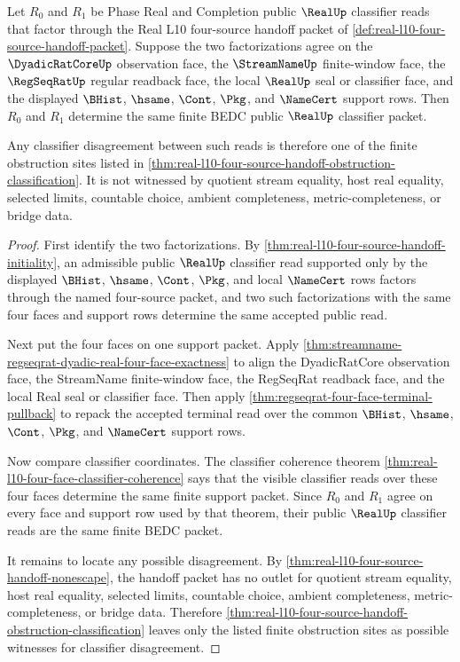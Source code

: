 \begin{theorem}
\label{thm:real-l10-four-source-handoff-classifier-congruence}
Let $R_0$ and $R_1$ be Phase Real and Completion public $\RealUp$ classifier reads that factor through the Real L10 four-source handoff packet of \autoref{def:real-l10-four-source-handoff-packet}. Suppose the two factorizations agree on the $\DyadicRatCoreUp$ observation face, the $\StreamNameUp$ finite-window face, the $\RegSeqRatUp$ regular readback face, the local $\RealUp$ seal or classifier face, and the displayed $\BHist$, $\hsame$, $\Cont$, $\Pkg$, and $\NameCert$ support rows. Then $R_0$ and $R_1$ determine the same finite BEDC public $\RealUp$ classifier packet.

Any classifier disagreement between such reads is therefore one of the finite obstruction sites listed in \autoref{thm:real-l10-four-source-handoff-obstruction-classification}. It is not witnessed by quotient stream equality, host real equality, selected limits, countable choice, ambient completeness, metric-completeness, or bridge data.
\end{theorem}
\begin{proof}
First identify the two factorizations. By \autoref{thm:real-l10-four-source-handoff-initiality}, an admissible public $\RealUp$ classifier read supported only by the displayed $\BHist$, $\hsame$, $\Cont$, $\Pkg$, and local $\NameCert$ rows factors through the named four-source packet, and two such factorizations with the same four faces and support rows determine the same accepted public read.

Next put the four faces on one support packet. Apply \autoref{thm:streamname-regseqrat-dyadic-real-four-face-exactness} to align the DyadicRatCore observation face, the StreamName finite-window face, the RegSeqRat readback face, and the local Real seal or classifier face. Then apply \autoref{thm:regseqrat-four-face-terminal-pullback} to repack the accepted terminal read over the common $\BHist$, $\hsame$, $\Cont$, $\Pkg$, and $\NameCert$ support rows.

Now compare classifier coordinates. The classifier coherence theorem \autoref{thm:real-l10-four-face-classifier-coherence} says that the visible classifier reads over these four faces determine the same finite support packet. Since $R_0$ and $R_1$ agree on every face and support row used by that theorem, their public $\RealUp$ classifier reads are the same finite BEDC packet.

It remains to locate any possible disagreement. By \autoref{thm:real-l10-four-source-handoff-nonescape}, the handoff packet has no outlet for quotient stream equality, host real equality, selected limits, countable choice, ambient completeness, metric-completeness, or bridge data. Therefore \autoref{thm:real-l10-four-source-handoff-obstruction-classification} leaves only the listed finite obstruction sites as possible witnesses for classifier disagreement.
\end{proof}
